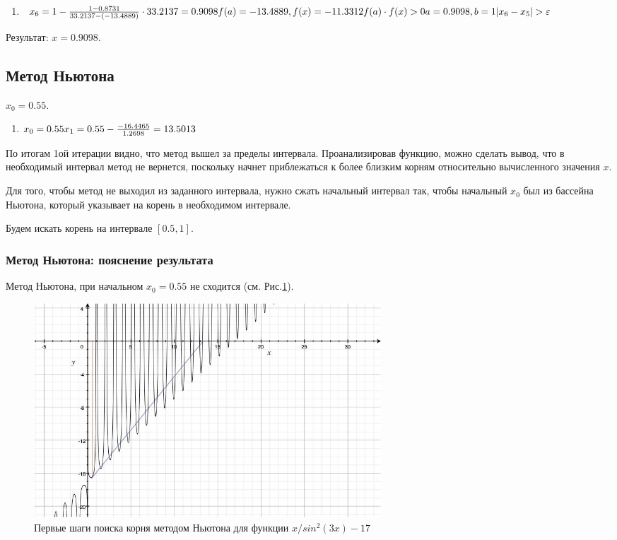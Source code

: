 \documentclass{article}
\begin{document}
\begin{enumerate}[label= итерация \arabic{*}:]
  \item 
  \begin{math}
    x_{6}=1 -
    \frac{1-0.8731}{33.2137-(-13.4889)} \cdot
    33.2137=0.9098\\
    f(a) = -13.4889, f(x)=-11.3312\\
    f(a) \cdot f(x) >0 \\
    a=0.9098, b=1\\
    |x_{6} - x_{5}| > \varepsilon \\ 
  \end{math}
\end{enumerate}
Результат: $x = 0.9098$.

\subsection{Метод Ньютона}
$x_{0}=0.55$.
\begin{enumerate}[label= итерация \arabic{*}:]
  \item
  \begin{math}
    x_{0}=0.55\\
    x_{1} = 0.55 - \frac{-16.4465}{1.2698} = 13.5013
  \end{math}
\end{enumerate}
По итогам 1ой итерации видно, что метод вышел за пределы интервала.
Проанализировав функцию, можно сделать вывод, что в необходимый интервал метод не вернется,
поскольку начнет приблежаться к более близким корням относительно вычисленного
значения $x$.

Для того, чтобы метод не выходил из заданного интервала, нужно сжать
начальный интервал так, чтобы начальный $x_0$ был из бассейна Ньютона, который
указывает на корень в необходимом интервале.

Будем искать корень на интервале $[0.5, 1]$.

\subsubsection{Метод Ньютона: пояснение результата}
  Метод Ньютона, при начальном $x_{0} = 0.55$ не сходится (см.
  Рис.\ref{equ_newton_img}).
  \begin{figure}[b]
    \includegraphics[width=13cm]{equations_newton.png}
    \caption{Первые шаги поиска корня методом Ньютона для функции $x/sin^2(3x)
    - 17$}
    \label{equ_newton_img}
  \end{figure}
\end{document}

